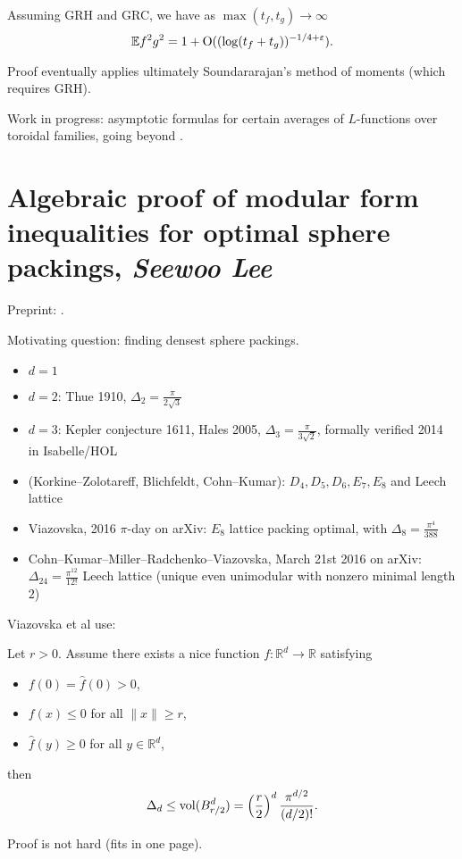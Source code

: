 \documentclass[reqno]{amsart} 
\begin{document}
\begin{theorem}
  Assuming GRH and GRC, we have as $\max(t_f,t_g) \rightarrow \infty$
  \begin{equation*}
    \mathbb{E} f^2 g^2 = 1 + \operatorname{O}((\log(t_f + t_g))^{- 1/4 + \varepsilon}).
  \end{equation*}
\end{theorem}
Proof eventually applies ultimately Soundararajan's method of moments (which requires GRH).

Work in progress: asymptotic formulas for certain averages of $L$-functions over toroidal families, going beyond \cite{2023arXiv2303.11664}.

\section{Algebraic proof of modular form inequalities for optimal sphere packings, \textnormal{\emph{Seewoo Lee}}}
Preprint: \cite{2024arXiv2406.14659}.

Motivating question: finding densest sphere packings.
\begin{itemize}
\item $d = 1$
\item $d = 2$: Thue 1910, $\Delta_2 = \frac{\pi}{2 \sqrt{3}}$
\item $d =3$: Kepler conjecture 1611, Hales 2005, $\Delta_3 = \frac{\pi}{3 \sqrt{2}}$, formally verified 2014 in Isabelle/HOL
\item (Korkine--Zolotareff, Blichfeldt, Cohn--Kumar): $D_4, D_5, D_6, E_7, E_8$ and Leech lattice
\item Viazovska, 2016 $\pi$-day on arXiv: $E_8$ lattice packing optimal, with $\Delta_8 = \frac{\pi^4}{388}$
\item Cohn--Kumar--Miller--Radchenko--Viazovska, March 21st 2016 on arXiv: $\Delta_{24} = \frac{\pi^{12}}{12!}$ Leech lattice (unique even unimodular with nonzero minimal length $2$)
\end{itemize}

Viazovska et al use:
\begin{theorem}
  Let $r > 0$.  Assume there exists a nice function $f : \mathbb{R}^d \rightarrow \mathbb{R}$
  satisfying
  \begin{itemize}
  \item $f(0) = \hat{f}(0) > 0$,
  \item $f(x) \leq 0$ for all $\lVert x \rVert \geq r$,
  \item $\hat{f}(y) \geq 0$ for all $y \in \mathbb{R}^d$,
  \end{itemize}
  then
  \begin{equation*}
    \Delta_d \leq \operatorname{vol}(B_{r/2}^d) = \left( \frac{r}{2} \right)^d \frac{\pi^{d/2}}{(d / 2)!}.
  \end{equation*}
\end{theorem}
Proof is not hard (fits in one page).
\end{document}
